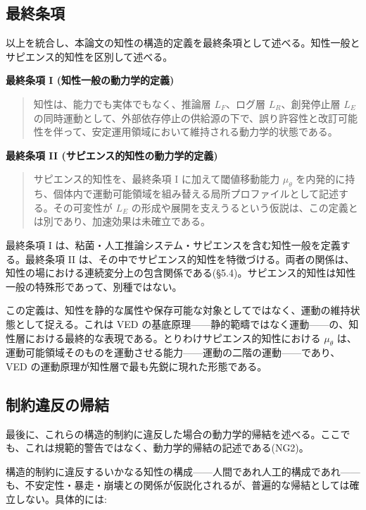 \subsection{最終条項}


以上を統合し、本論文の知性の構造的定義を最終条項として述べる。知性一般とサピエンス的知性を区別して述べる。

\textbf{最終条項 I (知性一般の動力学的定義)}

\begin{quote}
知性は、能力でも実体でもなく、推論層 $L_F$、ログ層 $L_R$、創発停止層 $L_E$ の同時運動として、外部依存停止の供給源の下で、誤り許容性と改訂可能性を伴って、安定運用領域において維持される動力学的状態である。
\end{quote}


\textbf{最終条項 II (サピエンス的知性の動力学的定義)}

\begin{quote}
サピエンス的知性を、最終条項 I に加えて閾値移動能力 $\mu_\theta$ を内発的に持ち、個体内で運動可能領域を組み替える局所プロファイルとして記述する。その可変性が $L_E$ の形成や展開を支えうるという仮説は、この定義とは別であり、加速効果は未確立である。
\end{quote}


最終条項 I は、粘菌・人工推論システム・サピエンスを含む知性一般を定義する。最終条項 II は、その中でサピエンス的知性を特徴づける。両者の関係は、知性の場における連続変分上の包含関係である(\S{}5.4)。サピエンス的知性は知性一般の特殊形であって、別種ではない。

この定義は、知性を静的な属性や保存可能な対象としてではなく、運動の維持状態として捉える。これは VED の基底原理——静的範疇ではなく運動——の、知性層における最終的な表現である。とりわけサピエンス的知性における $\mu_\theta$ は、運動可能領域そのものを運動させる能力——運動の二階の運動——であり、VED の運動原理が知性層で最も先鋭に現れた形態である。

\bigskip


\subsection{制約違反の帰結}


最後に、これらの構造的制約に違反した場合の動力学的帰結を述べる。ここでも、これは規範的警告ではなく、動力学的帰結の記述である(NG2)。

構造的制約に違反するいかなる知性の構成——人間であれ人工的構成であれ——も、不安定性・暴走・崩壊との関係が仮説化されるが、普遍的な帰結としては確立しない。具体的には:


